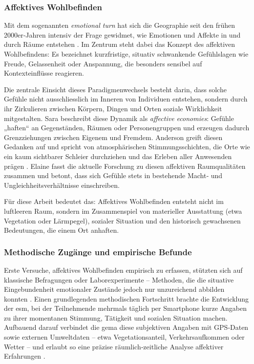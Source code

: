 \subsubsection{Affektives Wohlbefinden}

Mit dem sogenannten \emph{emotional turn} hat sich die Geographie seit den frühen 2000er‑Jahren intensiv der Frage gewidmet, wie Emotionen und Affekte in und durch Räume entstehen \parencite{hoSocialGeographyIII2024}. Im Zentrum steht dabei das Konzept des affektiven Wohlbefindens: Es bezeichnet kurzfristige, situativ schwankende Gefühlslagen wie Freude, Gelassenheit oder Anspannung, die besonders sensibel auf Kontexteinflüsse reagieren. 

Die zentrale Einsicht dieses Paradigmenwechsels besteht darin, dass solche Gefühle nicht ausschliesslich im Inneren von Individuen entstehen, sondern durch ihr Zirkulieren zwischen Körpern, Dingen und Orten soziale Wirklichkeit mitgestalten. Sara \textcite{ahmedAffectiveEconomies2004} beschreibt diese Dynamik als \emph{affective economies}: Gefühle „haften“ an Gegenständen, Räumen oder Personengruppen und erzeugen dadurch Grenzziehungen zwischen Eigenem und Fremdem. Anderson greift diesen Gedanken auf und spricht von atmosphärischen Stimmungsschichten, die Orte wie ein kaum sichtbarer Schleier durchziehen und das Erleben aller Anwesenden prägen \parencite{andersonAffectiveAtmospheres2009}. Elaine \textcite{hoSocialGeographyIII2024} fasst die aktuelle Forschung zu diesen affektiven Raumqualitäten zusammen und betont, dass sich Gefühle stets in bestehende Macht‑ und Ungleichheitsverhältnisse einschreiben.

Für diese Arbeit bedeutet das: Affektives Wohlbefinden entsteht nicht im luftleeren Raum, sondern im Zusammenspiel von materieller Ausstattung (etwa Vegetation oder Lärmpegel), sozialer Situation und den historisch gewachsenen Bedeutungen, die einem Ort anhaften.


\subsubsection{Methodische Zugänge und empirische Befunde}

Erste Versuche, affektives Wohlbefinden empirisch zu erfassen, stützten sich auf klassische Befragungen oder Laborexperimente – Methoden, die die situative Eingebundenheit emotionaler Zustände jedoch nur unzureichend abbilden konnten \parencite{kirchnerSpatiotemporalDeterminantsMental2016}. Einen grundlegenden methodischen Fortschritt brachte die Entwicklung der \acrfull{esm}, bei der Teilnehmende mehrmals täglich per Smartphone kurze Angaben zu ihrer momentanen Stimmung, Tätigkeit und sozialen Situation machen. Aufbauend darauf verbindet die \acrfull{gema} diese subjektiven Angaben mit GPS‑Daten sowie externen Umweltdaten – etwa Vegetationsanteil, Verkehrsaufkommen oder Wetter – und erlaubt so eine präzise räumlich‑zeitliche Analyse affektiver Erfahrungen \parencite{kirchnerSpatiotemporalDeterminantsMental2016}.

